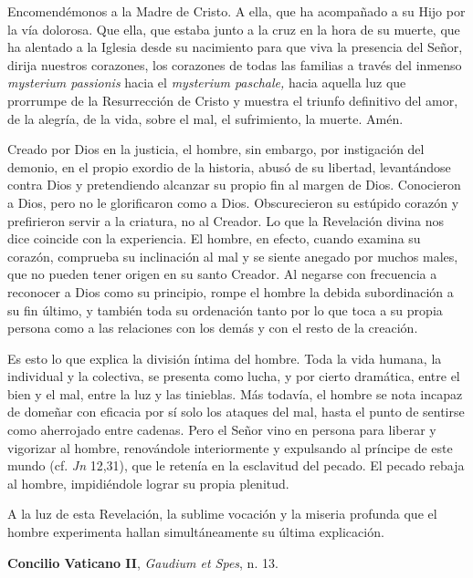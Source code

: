 \begin{body}
Encomendémonos a la Madre de Cristo. A ella, que ha acompañado a su Hijo por la vía dolorosa. Que ella, que estaba junto a la cruz en la hora de su muerte, que ha alentado a la Iglesia desde su nacimiento para que viva la presencia del Señor, dirija nuestros corazones, los corazones de todas las familias a través del inmenso \textit{mysterium passionis} hacia el \textit{mysterium paschale,} hacia aquella luz que prorrumpe de la Resurrección de Cristo y muestra el triunfo definitivo del amor, de la alegría, de la vida, sobre el mal, el sufrimiento, la muerte. Amén.
\end{body}

\begin{patercite}
Creado por Dios en la justicia, el hombre, sin embargo, por instigación del demonio, en el propio exordio de la historia, abusó de su libertad, levantándose contra Dios y pretendiendo alcanzar su propio fin al margen de Dios. Conocieron a Dios, pero no le glorificaron como a Dios. Obscurecieron su estúpido corazón y prefirieron servir a la criatura, no al Creador. Lo que la Revelación divina nos dice coincide con la experiencia. El hombre, en efecto, cuando examina su corazón, comprueba su inclinación al mal y se siente anegado por muchos males, que no pueden tener origen en su santo Creador. Al negarse con frecuencia a reconocer a Dios como su principio, rompe el hombre la debida subordinación a su fin último, y también toda su ordenación tanto por lo que toca a su propia persona como a las relaciones con los demás y con el resto de la creación.

Es esto lo que explica la división íntima del hombre. Toda la vida humana, la individual y la colectiva, se presenta como lucha, y por cierto dramática, entre el bien y el mal, entre la luz y las tinieblas. Más todavía, el hombre se nota incapaz de domeñar con eficacia por sí solo los ataques del mal, hasta el punto de sentirse como aherrojado entre cadenas. Pero el Señor vino en persona para liberar y vigorizar al hombre, renovándole interiormente y expulsando al príncipe de este mundo (cf. \textit{Jn} 12,31), que le retenía en la esclavitud del pecado. El pecado rebaja al hombre, impidiéndole lograr su propia plenitud.

A la luz de esta Revelación, la sublime vocación y la miseria profunda que el hombre experimenta hallan simultáneamente su última explicación.

\textbf{Concilio Vaticano II}, \textit{Gaudium et Spes}, n. 13.
\end{patercite}

